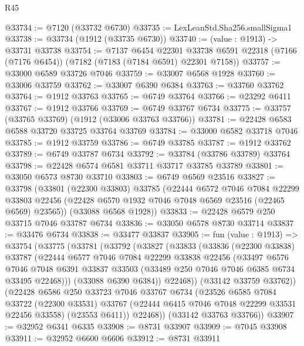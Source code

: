 \begin{lexlean}{R45}
\begin{coremodule}
{@33734 := @7120 (@33732 @6730)
@33735 := LexLeanStd.Sha256.smallSigma1
@33738 := @33734 (@1912 (@33735 @6730))
@33740 := (value : @1913) -> @33731 @33738
@33754 := @7137
    @6454
    @22301
    @33738
    @6591
    @22318
    (@7166 (@7176 @6454))
    (@7182 (@7183 (@7184 @6591) @22301 @7158))
@33757 := @33000 @6589 @33726 @7046
@33759 := @33007 @6568 @1928
@33760 := @33006 @33759
@33762 := @33007 @6390 @6384
@33763 := @33760 @33762
@33764 := @1912 @33763
@33765 := @6749 @33764
@33766 := @23292 @6411
@33767 := @1912 @33766
@33769 := @6749 @33767 @6734
@33775 := @33757 (@33765 @33769) (@1912 (@33006 @33763 @33766))
@33781 := @22428 @6583 @6588 @33720 @33725 @33764 @33769
@33784 := @33000 @6582 @33718 @7046
@33785 := @1912 @33759
@33786 := @6749 @33785
@33787 := @1912 @33762
@33789 := @6749 @33787 @6734
@33792 := @33784 (@33786 @33789) @33764
@33798 := @22428 @6574 @6581 @33711 @33717 @33785 @33789
@33801 := @33050 @6573 @8730 @33710
@33803 := @6749 @6569 @23516
@33827 := @33798
    (@33801
      (@22300 @33803)
      @33785
      (@22444
        @6572
        @7046
        @7084
        @22299
        @33803
        @22456
        (@22428 @6570 @1932 @7046 @7048 @6569 @23516 (@22465 @6569) @23565))
      (@33088 @6568 @1928))
@33833 := @22428 @6579 @250 @33715 @7046 @33787 @6734
@33836 := @33050 @6578 @8730 @33714
@33837 := @33476 @6734
@33838 := @33477 @33837
@33905 := fun (value : @1913) =>
  @33754
    (@33775
      (@33781
        (@33792
          (@33827
            (@33833
              (@33836
                (@22300 @33838)
                @33787
                (@22444
                  @6577
                  @7046
                  @7084
                  @22299
                  @33838
                  @22456
                  (@33497
                    @6576
                    @7046
                    @7048
                    @6391
                    @33837
                    @33503
                    (@33489 @250 @7046 @7046 @6385 @6734 @33495 @22468)))
                (@33088 @6390 @6384))
              @22468))
          (@33142 @33759 @33762))
        (@22428
          @6586
          @250
          @33723
          @7046
          @33767
          @6734
          (@23526
            @6585
            @7084
            @33722
            (@22300 @33531)
            @33767
            (@22444 @6415 @7046 @7048 @22299 @33531 @22456 @33558)
            (@23553 @6411))
          @22468))
      (@33142 @33763 @33766))
@33907 := @32952 @6341 @6335
@33908 := @8731 @33907
@33909 := @7045 @33908
@33911 := @32952 @6600 @6606
@33912 := @8731 @33911
}
\end{coremodule}
\end{lexlean}
